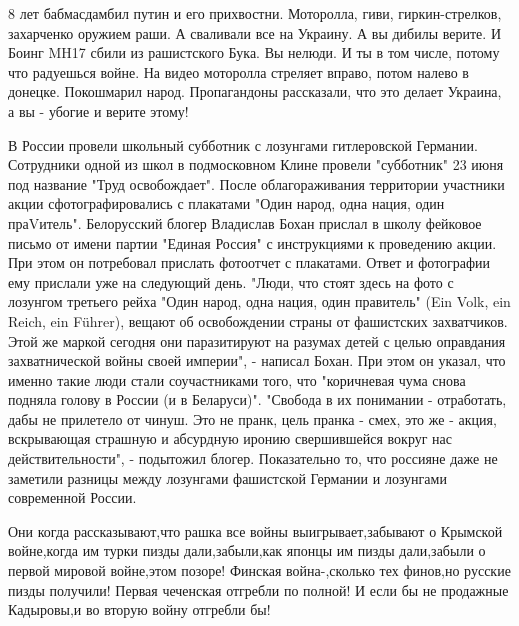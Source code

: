 8 лет бабмасдамбил путин и его прихвостни. Моторолла, гиви, гиркин-стрелков,
захарченко оружием раши. А сваливали все на Украину. А вы дибилы верите. И
Боинг MH17 сбили из рашистского Бука. Вы нелюди. И ты в том числе, потому что
радуешься войне.  На видео моторолла стреляет вправо, потом налево в донецке.
Покошмарил народ. Пропагандоны рассказали, что это делает Украина, а вы -
убогие и верите этому!

В России провели школьный субботник с лозунгами гитлеровской Германии.
Сотрудники одной из школ в подмосковном Клине провели "субботник" 23 июня под
название "Труд освобождает". После облагораживания территории участники акции
сфотографировались с плакатами "Один народ, одна нация, один праVитель".
Белорусский блогер Владислав Бохан прислал в школу фейковое письмо от имени
партии "Единая Россия" с инструкциями к проведению акции. При этом он
потребовал прислать фотоотчет с плакатами. Ответ и фотографии ему прислали уже
на следующий день. "Люди, что стоят здесь на фото с лозунгом третьего рейха
"Один народ, одна нация, один правитель" (Ein Volk, ein Reich, ein Führer),
вещают об освобождении страны от фашистских захватчиков. Этой же маркой сегодня
они паразитируют на разумах детей с целью оправдания захватнической войны своей
империи", - написал Бохан. При этом он указал, что именно такие люди стали
соучастниками того, что "коричневая чума снова подняла голову в России (и в
Беларуси)". "Свобода в их понимании - отработать, дабы не прилетело от чинуш.
Это не пранк, цель пранка - смех, это же - акция, вскрывающая страшную и
абсурдную иронию свершившейся вокруг нас действительности", - подытожил блогер.
Показательно то, что россияне даже не заметили разницы между лозунгами
фашистской Германии и лозунгами современной России.

Они когда рассказывают,что рашка все войны выигрывает,забывают о Крымской
войне,когда им турки пизды дали,забыли,как японцы им пизды дали,забыли о первой
мировой войне,этом позоре! Финская война-,сколько тех финов,но русские пизды
получили! Первая чеченская отгребли по полной! И если бы не продажные
Кадыровы,и во вторую войну отгребли бы!

